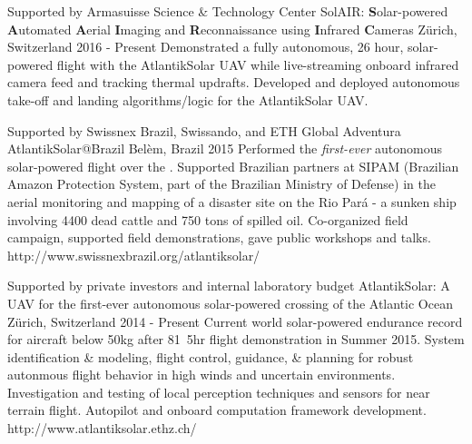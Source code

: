 \label{sec:proj}

\vspace{0.0mm}
\begin{cventries}
\begin{multicols}{2}
  \cvprojentry
    {Supported by Armasuisse Science \& Technology Center} %
    {SolAIR: \textbf{S}olar-powered \textbf{A}utomated \textbf{A}erial \textbf{I}maging and \textbf{R}econnaissance using \textbf{I}nfrared \textbf{C}ameras} %
    {Z\"{u}rich, Switzerland} %
    {2016 - Present} %
    {Demonstrated a fully autonomous, 26 hour, solar-powered flight with the AtlantikSolar UAV while live-streaming onboard infrared camera feed and tracking thermal updrafts.} %
    {Developed and deployed autonomous take-off and landing algorithms/logic for the AtlantikSolar UAV.} %
	{}
	
  \cvprojentry
    {Supported by Swissnex Brazil, Swissando, and ETH Global} %
    {Adventura AtlantikSolar@Brazil} %
    {Bel\`{e}m, Brazil} %
    {2015} %
    {Performed the \emph{first-ever} autonomous solar-powered flight over the . Supported Brazilian partners at SIPAM (Brazilian Amazon Protection System, part of the Brazilian Ministry of Defense) in the aerial monitoring and mapping of a disaster site on the Rio Pará - a sunken ship involving 4400 dead cattle and 750 tons of spilled oil.} %
    {Co-organized field campaign, supported field demonstrations, gave public workshops and talks.} %
	{http://www.swissnexbrazil.org/atlantiksolar/}
	
  \cvprojentry
    {Supported by private investors and internal laboratory budget} %
    {AtlantikSolar: A UAV for the first-ever autonomous solar-powered crossing of the Atlantic Ocean} %
    {Z\"{u}rich, Switzerland} %
    {2014 - Present} %
    {Current world solar-powered endurance record for aircraft below \unit{50}{kg} after \unit{81.5}{hr} flight demonstration in Summer 2015.} %
    {System identification \& modeling, flight control, guidance, \& planning for robust autonmous flight behavior in high winds and uncertain environments. Investigation and testing of local perception techniques and sensors for near terrain flight. Autopilot and onboard computation framework development.} %
	{http://www.atlantiksolar.ethz.ch/}
	

\end{multicols}
\end{cventries}
